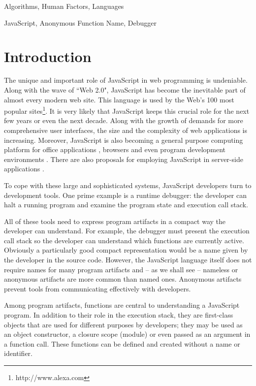 \documentclass[10pt, preprint]{sigplanconf}
\begin{document}

\terms
Algorithms, Human Factors, Languages

\keywords
JavaScript, Anonymous Function Name, Debugger

\section{Introduction}
The unique and important role of JavaScript in web programming is undeniable. Along with the wave of ``Web 2.0", JavaScript has become the inevitable part of almost every modern web site. This language is used by the Web's 100 most popular sites\footnote[1]{http://www.alexa.com}\cite{Richards1}. It is very likely that JavaScript keeps this crucial role for the next few years or even the next decade. Along with the growth of demands for more comprehensive user interfaces, the size and the complexity of web applications is increasing. Moreover, JavaScript is also becoming a general purpose computing platform\cite{Richards2} for office applications \cite{JSOffice, JSOffice2}, browsers \cite{FAO, GCE} and even program development environments \cite{Ingalls}. There are also proposals for employing JavaScript in server-side applications \cite{SSJSR, CJS}.

To cope with these large and sophisticated systems, JavaScript developers turn to development tools. One prime example is a runtime debugger: the developer can halt a running program and examine the program state and execution call stack. 

All of these tools need to express program artifacts in a compact way the developer can understand.  For example, the debugger must present the execution call stack so the developer can understand which functions are currently active.  Obviously a particularly good compact representation would be a name given by the developer in the source code. However, the JavaScript language itself does not require names for many program artifacts and -- as we shall see -- nameless or anonymous artifacts are more common than named ones. Anonymous artifacts prevent tools from communicating effectively with developers.

Among program artifacts, functions are central to understanding a JavaScript program. In addition to their role in the execution stack, they are first-class objects that are used for different purposes by developers; they may be used as an object constructor, a closure scope (module) or even  passed as an argument in a function call.  These functions can be defined and created without a name or identifier.  
\end{document}
